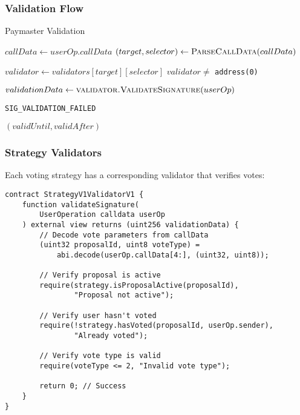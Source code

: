 \documentclass[11pt,a4paper]{article}
\begin{document}
\subsubsection{Validation Flow}

\begin{algorithm}
\caption{Paymaster Validation}
\begin{algorithmic}[1]
    \State $callData \gets userOp.callData$
    \State $(target, selector) \gets \Call{ParseCallData}{callData}$

    \State $validator \gets validators[target][selector]$
    \Require $validator \neq$ \texttt{address(0)}

    \State $validationData \gets \Call{validator.ValidateSignature}{userOp}$

        \State \Return \texttt{SIG\_VALIDATION\_FAILED}
    \EndIf

    \State \Return $(validUntil, validAfter)$
\EndFunction
\end{algorithmic}
\end{algorithm}

\subsubsection{Strategy Validators}

Each voting strategy has a corresponding validator that verifies votes:

\begin{lstlisting}[caption=StrategyV1 Validator]
contract StrategyV1ValidatorV1 {
    function validateSignature(
        UserOperation calldata userOp
    ) external view returns (uint256 validationData) {
        // Decode vote parameters from callData
        (uint32 proposalId, uint8 voteType) =
            abi.decode(userOp.callData[4:], (uint32, uint8));

        // Verify proposal is active
        require(strategy.isProposalActive(proposalId),
                "Proposal not active");

        // Verify user hasn't voted
        require(!strategy.hasVoted(proposalId, userOp.sender),
                "Already voted");

        // Verify vote type is valid
        require(voteType <= 2, "Invalid vote type");

        return 0; // Success
    }
}
\end{lstlisting}
\end{document}
